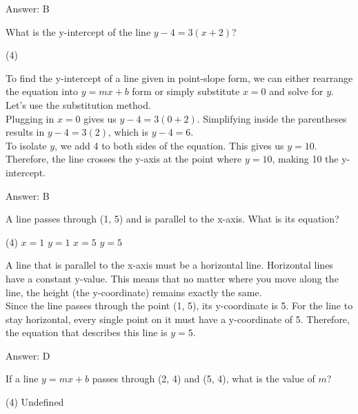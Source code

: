 \documentclass[11pt,paper=a4,answers]{exam}
\begin{document}
\begin{questions}
\begin{solution}
\vspace{15pt}
Answer: \colorbox{yellow!100}{B}
\end{solution}

\question
What is the y-intercept of the line $y - 4 = 3(x + 2)$?
\begin{tasks}(4)
\end{tasks}

\begin{solution}
To find the y-intercept of a line given in point-slope form, we can either rearrange the equation into $y = mx + b$ form or simply substitute $x = 0$ and solve for $y$. Let's use the substitution method.
\\[10pt]
Plugging in $x = 0$ gives us $y - 4 = 3(0 + 2)$. Simplifying inside the parentheses results in $y - 4 = 3(2)$, which is $y - 4 = 6$.
\\[10pt]
To isolate $y$, we add 4 to both sides of the equation. This gives us $y = 10$. Therefore, the line crosses the y-axis at the point where $y = 10$, making 10 the y-intercept.

\vspace{15pt}
Answer: \colorbox{yellow!100}{B}
\end{solution}

\question
A line passes through (1, 5) and is parallel to the x-axis. What is its equation?
\begin{tasks}(4)
    \task $x = 1$
    \task $y = 1$
    \task $x = 5$
    \task $y = 5$
\end{tasks}

\begin{solution}
A line that is parallel to the x-axis must be a horizontal line. Horizontal lines have a constant y-value. This means that no matter where you move along the line, the height (the y-coordinate) remains exactly the same.
\\[10pt]
Since the line passes through the point (1, 5), its y-coordinate is 5. For the line to stay horizontal, every single point on it must have a y-coordinate of 5. Therefore, the equation that describes this line is $y = 5$.

\vspace{15pt}
Answer: \colorbox{yellow!100}{D}
\end{solution}

\question
If a line $y = mx + b$ passes through (2, 4) and (5, 4), what is the value of $m$?
\begin{tasks}(4)
    \task Undefined
\end{tasks}


\end{questions}
\end{document}
